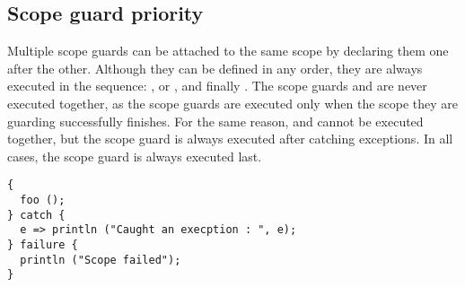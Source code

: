 \subsection{Scope guard priority}

Multiple scope guards can be attached to the same scope by declaring them one
after the other. Although they can be defined in any order, they are always
executed in the sequence: ,  or , and
finally . The scope guards  and  are
never executed together, as the  scope guards are executed only
when the scope they are guarding successfully finishes. For the same reason,
 and  cannot be executed together, but the
 scope guard is always executed after catching exceptions. In all
cases, the  scope guard is always executed last.

\begin{lstlisting}[style=coloredverbatim]
{
  foo ();
} catch {
  e => println ("Caught an execption : ", e);
} failure {
  println ("Scope failed");
}
\end{lstlisting}

\vfill%
\pagebreak

